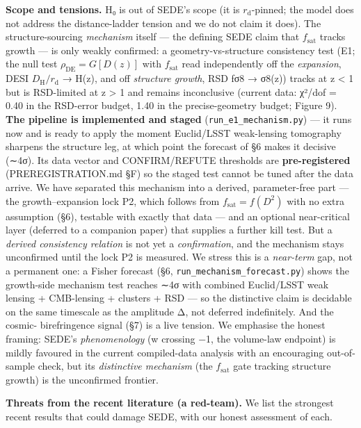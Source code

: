 \documentclass[
  10pt,
]{article}
\begin{document}
\textbf{Scope and tensions.} H₀ is out of SEDE's scope (it is
\(r_{\mathrm{d}}\)-pinned; the model does not address the
distance-ladder tension and we do not claim it does). The
structure-sourcing \emph{mechanism} itself --- the defining SEDE claim
that \(f_{\mathrm{sat}}\) tracks growth --- is only weakly confirmed: a
geometry-vs-structure consistency test (E1; the null test
\(\rho _{\mathrm{DE}} = G[D(z)]\) with \(f_{\mathrm{sat}}\) read
independently off the \emph{expansion}, DESI
\(D_{\mathrm{H}}/r_{\mathrm{d}}\) → H(z), and off \emph{structure
growth}, RSD fσ8 → σ8(z)) tracks at z \textless{} 1 but is RSD-limited
at z \textgreater{} 1 and remains inconclusive (current data: χ²/dof =
0.40 in the RSD-error budget, 1.40 in the precise-geometry budget;
Figure 9). \textbf{The pipeline is implemented and staged}
(\texttt{run\_e1\_mechanism.py}) --- it runs now and is ready to apply
the moment Euclid/LSST weak-lensing tomography sharpens the structure
leg, at which point the forecast of §6 makes it decisive (∼4σ). Its data
vector and CONFIRM/REFUTE thresholds are \textbf{pre-registered}
(PREREGISTRATION.md §F) so the staged test cannot be tuned after the
data arrive. We have separated this mechanism into a derived,
parameter-free part --- the growth--expansion lock P2, which follows
from \(f_{\mathrm{sat}} = f(D^{2})\) with no extra assumption (§6),
testable with exactly that data --- and an optional near-critical layer
(deferred to a companion paper) that supplies a further kill test. But a
\emph{derived consistency relation} is not yet a \emph{confirmation},
and the mechanism stays unconfirmed until the lock P2 is measured. We
stress this is a \emph{near-term} gap, not a permanent one: a Fisher
forecast (§6, \texttt{run\_mechanism\_forecast.py}) shows the
growth-side mechanism test reaches ∼4σ with combined Euclid/LSST weak
lensing + CMB-lensing + clusters + RSD --- so the distinctive claim is
decidable on the same timescale as the amplitude Δ, not deferred
indefinitely. And the cosmic- birefringence signal (§7) is a live
tension. We emphasise the honest framing: SEDE's \emph{phenomenology} (w
crossing −1, the volume-law endpoint) is mildly favoured in the current
compiled-data analysis with an encouraging out-of-sample check, but its
\emph{distinctive mechanism} (the \(f_{\mathrm{sat}}\) gate tracking
structure growth) is the unconfirmed frontier.

\textbf{Threats from the recent literature (a red-team).} We list the
strongest recent results that could damage SEDE, with our honest
assessment of each.
\end{document}
